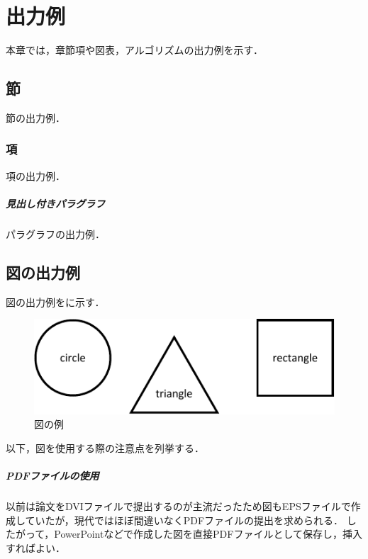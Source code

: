 
\chapter{出力例}

本章では，章節項や図表，アルゴリズムの出力例を示す．



\section{節}

節の出力例．


\subsection{項}

項の出力例．

\paragraph{見出し付きパラグラフ}

パラグラフの出力例．



\section{図の出力例}

図の出力例を\Fig{\ref{fig:sample}}に示す．

\begin{figure}[t]
  \centering
  \includegraphics{./figures/sample_figure.pdf}
  \caption{図の例}
  \label{fig:sample}
\end{figure}

以下，図を使用する際の注意点を列挙する．

\paragraph{PDFファイルの使用}

以前は論文をDVIファイルで提出するのが主流だったため図もEPSファイルで作成していたが，現代ではほぼ間違いなくPDFファイルの提出を求められる．
したがって，PowerPointなどで作成した図を直接PDFファイルとして保存し，挿入すればよい．

